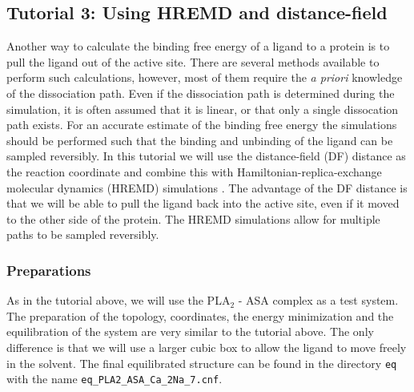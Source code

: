 
\subsection{Tutorial 3: Using HREMD and distance-field}
Another way to calculate the binding free energy of a ligand to a protein is to pull the ligand out of the active site. 
There are several methods available to perform such calculations, however, most of them require the \textit{a priori} knowledge of the dissociation path. 
Even if the dissociation path is determined during the simulation, it is often assumed that it is linear, or that only a single dissocation path exists. 
For an accurate estimate of the binding free energy the simulations should be performed such that the binding and unbinding of the ligand can be sampled reversibly.
In this tutorial we will use the distance-field (DF) distance as the reaction coordinate and combine this with Hamiltonian-replica-exchange molecular dynamics (HREMD) simulations \cite{deRuiter_2013}.
The advantage of the DF distance is that we will be able to pull the ligand back into the active site, even if it moved to the other side of the protein. 
The HREMD simulations allow for multiple paths to be sampled reversibly.

\subsubsection{Preparations}
As in the tutorial above, we will use the PLA$_2$ - ASA complex as a test system. 
The preparation of the topology, coordinates, the energy minimization and the equilibration of the system are very similar to the tutorial above. 
The only difference is that we will use a larger cubic box to allow the ligand to move freely in the solvent. 
The final equilibrated structure can be found in the directory \texttt{eq} with the name \texttt{eq\_PLA2\_ASA\_Ca\_2Na\_7.cnf}.

